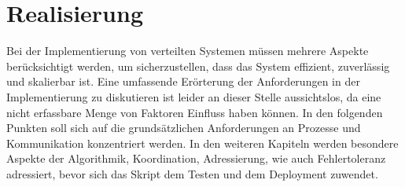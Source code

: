 \documentclass[../vs-script-first-v01.tex]{subfiles}
\begin{document}
\section{Realisierung}
Bei der Implementierung von verteilten Systemen müssen mehrere Aspekte berücksichtigt werden, um sicherzustellen, dass das System effizient, zuverlässig und skalierbar ist. Eine umfassende Erörterung der Anforderungen in der Implementierung zu diskutieren ist leider an dieser Stelle aussichtslos, da eine nicht erfassbare Menge von Faktoren Einfluss haben können. In den folgenden Punkten soll sich auf die grundsätzlichen Anforderungen an Prozesse und Kommunikation konzentriert werden. In den weiteren Kapiteln werden besondere Aspekte der Algorithmik, Koordination, Adressierung, wie auch Fehlertoleranz adressiert, bevor sich das Skript dem Testen und dem Deployment zuwendet. 
\end{document}
